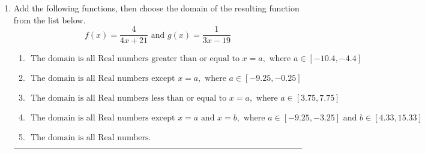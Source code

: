 \documentclass[14pt]{extbook}
\newcommand{\litem}[1]{\item#1\hspace*{-1cm}\rule{\textwidth}{0.4pt}}
\begin{document}
\begin{enumerate}
{\begin{enumerate}[label=\Alph*.]
\end{enumerate} }
\litem{
Add the following functions, then choose the domain of the resulting function from the list below.\[ f(x) = \frac{4}{4x+21} \text{ and } g(x) = \frac{1}{3x-19} \]\begin{enumerate}[label=\Alph*.]
\item \( \text{ The domain is all Real numbers greater than or equal to } x = a, \text{ where } a \in [-10.4, -4.4] \)
\item \( \text{ The domain is all Real numbers except } x = a, \text{ where } a \in [-9.25, -0.25] \)
\item \( \text{ The domain is all Real numbers less than or equal to } x = a, \text{ where } a \in [3.75, 7.75] \)
\item \( \text{ The domain is all Real numbers except } x = a \text{ and } x = b, \text{ where } a \in [-9.25, -3.25] \text{ and } b \in [4.33, 15.33] \)
\item \( \text{ The domain is all Real numbers. } \)

\end{enumerate} }
\end{enumerate}
\end{document}

